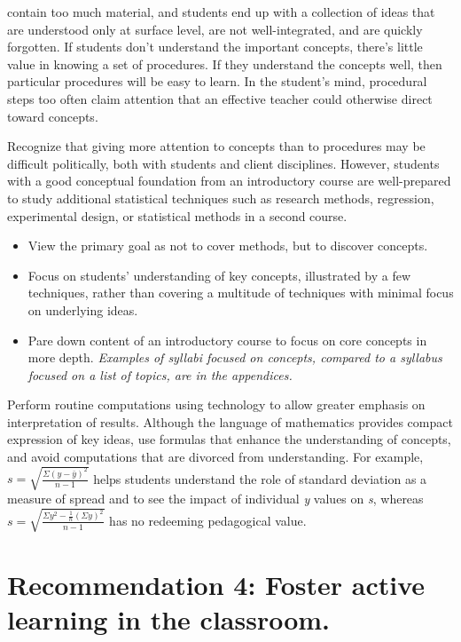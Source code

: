 \documentclass[twoside,openany]{tufte-book}
\begin{document}
 contain too much material, and students end up with a collection of ideas that are understood only at surface level, are not well-integrated, and are quickly forgotten. If students don't understand the important concepts, there's little value in knowing a set of procedures. If they understand the concepts well, then particular procedures will be easy to learn. In the student's mind, procedural steps too often claim attention that an effective teacher could otherwise direct toward concepts.
 
Recognize that giving more attention to concepts than to procedures may be difficult politically, both with students and client disciplines. However, students with a good conceptual foundation from an introductory course are well-prepared to study additional statistical techniques such as research methods, regression, experimental design, or statistical methods in a second course.
 
 \vspace{.2in}
\noindent {}
\begin{itemize}[leftmargin=1cm, itemsep=.2em]
\item View the primary goal as not to cover methods, but to discover concepts.
\item Focus on students' understanding of key concepts, illustrated by a few techniques, rather than covering a multitude of techniques with minimal focus on underlying ideas.
\item Pare down content of an introductory course to focus on core concepts in more depth.  \textit{Examples of syllabi focused on concepts, compared to a syllabus focused on a list of topics, are in the appendices.}
\end{itemize}
 
Perform routine computations using technology to allow greater emphasis on interpretation of results. Although the language of mathematics provides compact expression of key ideas, use formulas that enhance the understanding of concepts, and avoid computations that are divorced from understanding.  For example, $s=\sqrt{\frac{\Sigma(y-\bar{y})^2}{n-1}}$ helps students understand the role of standard deviation as a measure of spread and to see the impact of individual \textit{y} values on \textit{s}, whereas $s=\sqrt{\frac{\Sigma y^2 - \frac{1}{n}\left(\Sigma y\right)^2}{n-1}}$ has no redeeming pedagogical value.

\section{\textbf{Recommendation 4: Foster active learning in the classroom.}}
 
\end{document}
